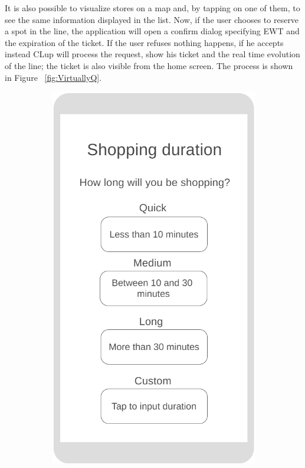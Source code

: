 It is also possible to visualize stores on a map and, by tapping on one of them, to see the same information displayed in the list. Now, if the user chooses to reserve a spot in the line, the application will open a confirm dialog specifying EWT and the expiration of the ticket. If the user refuses nothing happens, if he accepts instead CLup will process the request, show his ticket and the real time evolution of the line; the ticket is also visible from the home screen. The process is shown in Figure ~\ref{fig:VirtuallyQ}.\\
\begin{figure}[h!]
	\centering
	\begin{subfigure}[b]{0.3\textwidth}
		\includegraphics[width=\linewidth]{../Diagrams/WireframesCLup/ShoppingTime.png}

\end{subfigure}
\end{figure}
